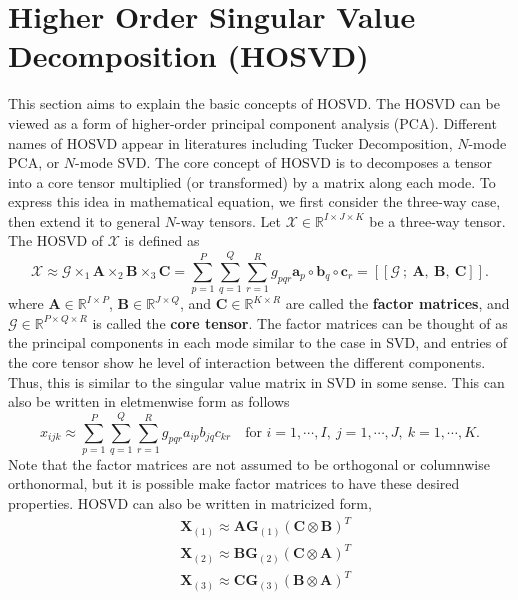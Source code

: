 \documentclass[preprint]{elsarticle}
\begin{document}
\section{Higher Order Singular Value Decomposition (HOSVD)}
\noindent This section aims to explain the basic concepts of HOSVD. The HOSVD can be viewed as a form of higher-order
principal component analysis (PCA). Different names of HOSVD appear in literatures including Tucker Decomposition, 
$N$-mode PCA, or $N$-mode SVD. The core concept of HOSVD is to decomposes a tensor into a core tensor multiplied
(or transformed) by a matrix along each mode. To express this idea in mathematical equation, we first consider the
three-way case, then extend it to general $N$-way tensors.
\vskip 0.3cm
\noindent Let $\boldsymbol{\mathscr{X}}\in\mathbb{R}^{I\times J\times K}$ be a three-way tensor. The HOSVD of $\boldsymbol{\mathscr{X}}$
is defined as
\begin{equation}
    \boldsymbol{\mathscr{X}}\approx \boldsymbol{\mathscr{G}}\times_1\mathbf{A}\times_2\mathbf{B}\times_3\mathbf{C}
    = \sum_{p=1}^P\sum_{q=1}^Q\sum_{r=1}^R g_{pqr}\mathbf{a}_p\circ\mathbf{b}_q\circ\mathbf{c}_r
    = [\![\boldsymbol{\mathscr{G}}\ ; \ \mathbf{A}, \ \mathbf{B}, \ \mathbf{C}]\!].
\end{equation}
where $\mathbf{A}\in\mathbb{R}^{I\times P}$, $\mathbf{B}\in\mathbb{R}^{J\times Q}$, and $\mathbf{C}\in\mathbb{R}^{K\times R}$ are called the \textbf{factor matrices},
and $\boldsymbol{\mathscr{G}}\in\mathbb{R}^{P\times Q\times R}$ is called the \textbf{core tensor}. The factor matrices
can be thought of as the principal components in each mode similar to the case in SVD, and entries of the core tensor show
he level of interaction between the different components. Thus, this is similar to the 
singular value matrix in SVD in some sense. This can also be written in eletmenwise form as follows
\begin{equation}
    x_{ijk}\approx\sum_{p=1}^P\sum_{q=1}^Q\sum_{r=1}^R g_{pqr}a_{ip}b_{jq}c_{kr} \quad \text{for } i=1,\cdots,I, \ j=1,\cdots,J, \
    k=1,\cdots, K.
\end{equation}
Note that the factor matrices are not assumed to be orthogonal or columnwise orthonormal, but it is possible make factor matrices
to have these desired properties. HOSVD can also be written in matricized form,
\begin{equation}
    \begin{aligned}
        & \mathbf{X}_{(1)}\approx \mathbf{A}\mathbf{G}_{(1)}\left(\mathbf{C}\otimes\mathbf{B}\right)^T \\
        & \mathbf{X}_{(2)}\approx \mathbf{B}\mathbf{G}_{(2)}\left(\mathbf{C}\otimes\mathbf{A}\right)^T \\
        & \mathbf{X}_{(3)}\approx \mathbf{C}\mathbf{G}_{(3)}\left(\mathbf{B}\otimes\mathbf{A}\right)^T
    \end{aligned}
\end{equation}
\end{document}

